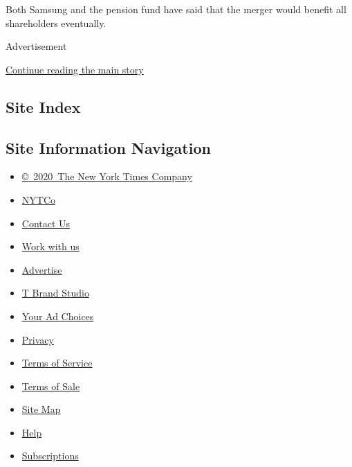 Both Samsung and the pension fund have said that the merger would
benefit all shareholders eventually.

Advertisement

\protect\hyperlink{after-bottom}{Continue reading the main story}

\hypertarget{site-index}{%
\subsection{Site Index}\label{site-index}}

\hypertarget{site-information-navigation}{%
\subsection{Site Information
Navigation}\label{site-information-navigation}}

\begin{itemize}
\tightlist
\item
  \href{https://help.nytimes.com/hc/en-us/articles/115014792127-Copyright-notice}{©~2020~The
  New York Times Company}
\end{itemize}

\begin{itemize}
\tightlist
\item
  \href{https://www.nytco.com/}{NYTCo}
\item
  \href{https://help.nytimes.com/hc/en-us/articles/115015385887-Contact-Us}{Contact
  Us}
\item
  \href{https://www.nytco.com/careers/}{Work with us}
\item
  \href{https://nytmediakit.com/}{Advertise}
\item
  \href{http://www.tbrandstudio.com/}{T Brand Studio}
\item
  \href{https://www.nytimes.com/privacy/cookie-policy\#how-do-i-manage-trackers}{Your
  Ad Choices}
\item
  \href{https://www.nytimes.com/privacy}{Privacy}
\item
  \href{https://help.nytimes.com/hc/en-us/articles/115014893428-Terms-of-service}{Terms
  of Service}
\item
  \href{https://help.nytimes.com/hc/en-us/articles/115014893968-Terms-of-sale}{Terms
  of Sale}
\item
  \href{https://spiderbites.nytimes.com}{Site Map}
\item
  \href{https://help.nytimes.com/hc/en-us}{Help}
\item
  \href{https://www.nytimes.com/subscription?campaignId=37WXW}{Subscriptions}
\end{itemize}
